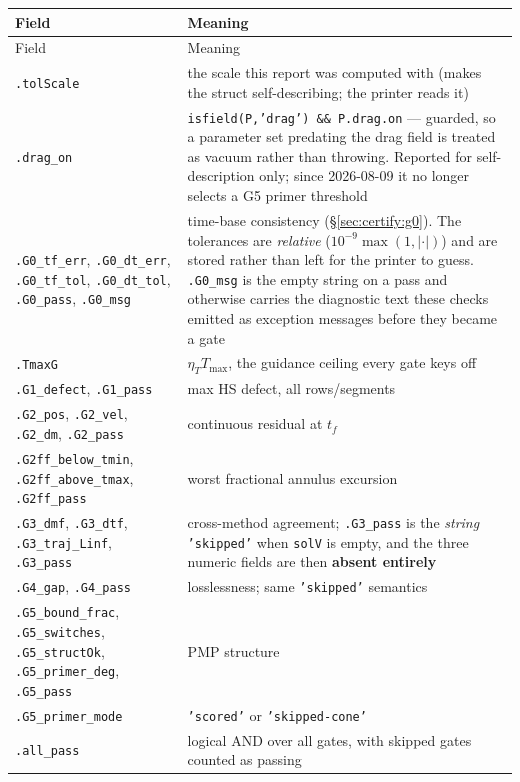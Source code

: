 \documentclass[11pt]{article}
\newcommand{\Tmax}{T_{\max}}
\newcommand{\etaT}{\eta_T}
\begin{document}
\begin{center}
\begin{longtable}{@{}L{5.4cm}L{9.2cm}@{}}
\toprule
Field & Meaning \\
\midrule
\endfirsthead
\toprule
Field & Meaning \\
\midrule
\endhead
\texttt{.tolScale} & the scale this report was computed with (makes the
  struct self-describing; the printer reads it) \\
\texttt{.drag\_on} & \texttt{isfield(P,'drag') \&\& P.drag.on} --- guarded,
  so a parameter set predating the drag field is treated as vacuum rather
  than throwing. Reported for self-description only; since 2026-08-09 it no
  longer selects a G5 primer threshold \\
\texttt{.G0\_tf\_err}, \texttt{.G0\_dt\_err}, \texttt{.G0\_tf\_tol},
  \texttt{.G0\_dt\_tol}, \texttt{.G0\_pass}, \texttt{.G0\_msg} & time-base
  consistency (\S\ref{sec:certify:g0}). The tolerances are \emph{relative}
  ($10^{-9}\max(1,|\cdot|)$) and are stored rather than left for the printer
  to guess. \texttt{.G0\_msg} is the empty string on a pass and otherwise
  carries the diagnostic text these checks emitted as exception messages
  before they became a gate \\
\texttt{.TmaxG} & $\etaT\Tmax$, the guidance ceiling every gate keys off \\
\texttt{.G1\_defect}, \texttt{.G1\_pass} & max HS defect, all rows/segments \\
\texttt{.G2\_pos}, \texttt{.G2\_vel}, \texttt{.G2\_dm}, \texttt{.G2\_pass} &
  continuous residual at $t_f$ \\
\texttt{.G2ff\_below\_tmin}, \texttt{.G2ff\_above\_tmax},
  \texttt{.G2ff\_pass} & worst fractional annulus excursion \\
\texttt{.G3\_dmf}, \texttt{.G3\_dtf}, \texttt{.G3\_traj\_Linf},
  \texttt{.G3\_pass} & cross-method agreement; \texttt{.G3\_pass} is the
  \emph{string} \texttt{'skipped'} when \texttt{solV} is empty, and the
  three numeric fields are then \textbf{absent entirely} \\
\texttt{.G4\_gap}, \texttt{.G4\_pass} & losslessness; same
  \texttt{'skipped'} semantics \\
\texttt{.G5\_bound\_frac}, \texttt{.G5\_switches}, \texttt{.G5\_structOk},
  \texttt{.G5\_primer\_deg}, \texttt{.G5\_pass} & PMP structure \\
\texttt{.G5\_primer\_mode} & \texttt{'scored'} or \texttt{'skipped-cone'} \\
\texttt{.all\_pass} & logical AND over all gates, with skipped gates counted
  as passing \\
\bottomrule
\end{longtable}
\end{center}
\end{document}
